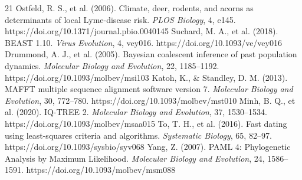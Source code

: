 \documentclass[10pt,letterpaper]{article}
\begin{document}
\begin{thebibliography}{21}
 Ostfeld, R. S., et al. (2006). Climate, deer, rodents, and acorns as determinants of local Lyme-disease risk. \emph{PLOS Biology}, 4, e145. https://doi.org/10.1371/journal.pbio.0040145
 Suchard, M. A., et al. (2018). BEAST 1.10. \emph{Virus Evolution}, 4, vey016. https://doi.org/10.1093/ve/vey016
 Drummond, A. J., et al. (2005). Bayesian coalescent inference of past population dynamics. \emph{Molecular Biology and Evolution}, 22, 1185--1192. https://doi.org/10.1093/molbev/msi103
 Katoh, K., \& Standley, D. M. (2013). MAFFT multiple sequence alignment software version 7. \emph{Molecular Biology and Evolution}, 30, 772--780. https://doi.org/10.1093/molbev/mst010
 Minh, B. Q., et al. (2020). IQ-TREE 2. \emph{Molecular Biology and Evolution}, 37, 1530--1534. https://doi.org/10.1093/molbev/msaa015
 To, T. H., et al. (2016). Fast dating using least-squares criteria and algorithms. \emph{Systematic Biology}, 65, 82--97. https://doi.org/10.1093/sysbio/syv068
 Yang, Z. (2007). PAML 4: Phylogenetic Analysis by Maximum Likelihood. \emph{Molecular Biology and Evolution}, 24, 1586--1591. https://doi.org/10.1093/molbev/msm088
\end{thebibliography}
\end{document}
